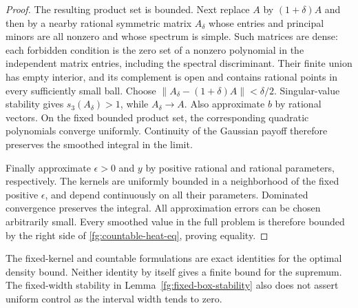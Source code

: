 \begin{proof}
The resulting product set is bounded.
Next replace $A$ by $(1+\delta)A$ and then by a nearby
rational symmetric matrix $A_\delta$ whose entries and
principal minors are all nonzero and whose spectrum is
simple.  Such matrices are dense: each forbidden condition
is the zero set of a nonzero polynomial in the independent
matrix entries, including the spectral discriminant.
Their finite union has empty interior, and its complement
is open and contains rational points in every sufficiently
small ball.
Choose
$\|A_\delta-(1+\delta)A\|<\delta/2$.
Singular-value stability gives
$s_3(A_\delta)>1$, while $A_\delta\to A$.
Also approximate $b$ by rational vectors.
On the fixed bounded product set, the corresponding
quadratic polynomials converge uniformly.
Continuity of the Gaussian payoff therefore preserves
the smoothed integral in the limit.

Finally approximate $\epsilon>0$ and $y$ by positive
rational and rational parameters, respectively.
The kernels are uniformly bounded in a neighborhood of
the fixed positive $\epsilon$, and depend continuously
on all their parameters.  Dominated convergence preserves
the integral.
All approximation errors can be chosen arbitrarily small.
Every smoothed value in the full problem is therefore
bounded by the right side of
\eqref{fg:countable-heat-eq}, proving equality.
\end{proof}

\begin{remark}
The fixed-kernel and countable formulations are exact
identities for the optimal density bound.  Neither identity
by itself gives a finite bound for the supremum.
The fixed-width stability in
Lemma~\ref{fg:fixed-box-stability} also does not assert
uniform control as the interval width tends to zero.
\end{remark}
